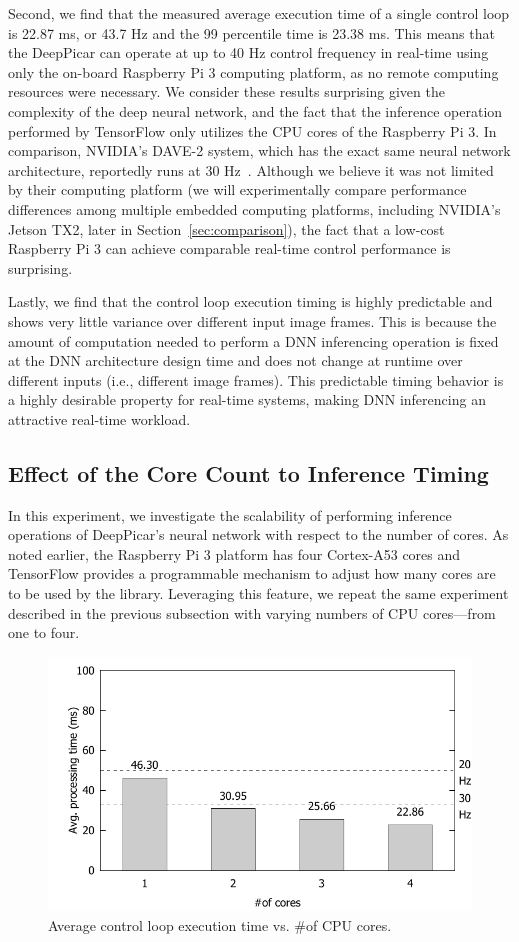 Second, we find that the measured average
execution time of a single control loop is 22.87 ms, or 43.7 Hz and
the 99 percentile time is 23.38 ms.
This means that the DeepPicar can operate
at up to 40 Hz control frequency in real-time using only the on-board
Raspberry Pi 3 computing platform, as no remote computing resources 
were necessary. We consider these results surprising given the complexity
of the deep neural network, and the fact that the inference operation
performed by TensorFlow only utilizes the CPU cores of the Raspberry Pi 3.
In comparison, NVIDIA's DAVE-2 system, which has the exact same neural
network architecture, reportedly runs at 30 Hz~\cite{Bojarski2016}. 
Although we believe it was not
limited by their computing platform (we will experimentally compare
performance differences among multiple embedded computing platforms,
including NVIDIA's Jetson TX2, later in
Section~\ref{sec:comparison}), the fact that a low-cost
Raspberry Pi 3 can achieve comparable real-time control performance is
surprising.

Lastly, we find that the control loop execution timing is highly
predictable and shows very little variance over different input image
frames. This is because the amount of computation needed to perform
a DNN inferencing operation is fixed at the DNN architecture design
time and does not change at runtime over different inputs (i.e.,
different image frames). This predictable timing behavior is a highly
desirable property for real-time systems, making DNN inferencing an
attractive real-time workload.

\subsection{Effect of the Core Count to Inference Timing}

In this experiment, we investigate the scalability of performing
inference operations of DeepPicar's neural network with respect to the
number of cores. As noted earlier, the Raspberry Pi 3 platform has
four Cortex-A53 cores and TensorFlow 
provides a programmable mechanism to adjust how many cores are to be
used by the library. Leveraging this feature, we repeat the
same experiment described in the previous subsection with varying
numbers of CPU cores---from one to four.

\begin{figure}[h]
  \centering
  \includegraphics[width=.45\textwidth]{figs/perf_vs_corecnt}
  \caption{Average control loop execution time vs. \#of CPU
    cores.}
  \label{fig:perf-vs-corecnt}
\end{figure}

